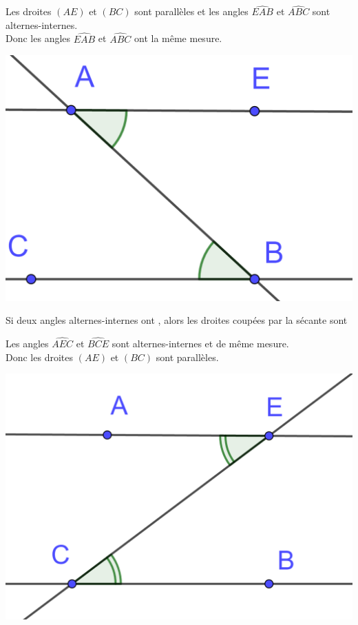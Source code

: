 \documentclass[12pt,a4paper]{article}
\begin{document}
\begin{myex}
	
	
	\begin{multicols}{2}
		Les droites $(AE)$ et $(BC)$ sont parallèles et les angles $\widehat{EAB}$ et $\widehat{ABC}$ sont alternes-internes. \\
		
		Donc les angles $\widehat{EAB}$ et $\widehat{ABC}$ ont la même mesure.
		
		\begin{center}
			\includegraphics[scale=0.15]{alt_int2}
		\end{center}
	\end{multicols}
\end{myex}


\begin{myprop}
	Si deux angles alternes-internes ont \hspace*{5cm}, alors les droites coupées par la sécante sont \hspace*{4cm}
\end{myprop}

\begin{myex}
	\begin{multicols}{2}
		
		Les angles $\widehat{AEC}$ et $\widehat{BCE}$ sont alternes-internes et de même mesure. \\
		
		Donc les droites $(AE)$ et $(BC)$ sont parallèles.
		
		\begin{center}
			\includegraphics[scale=0.15]{alt_int3}
		\end{center}
	\end{multicols}
\end{myex}
\end{document}
